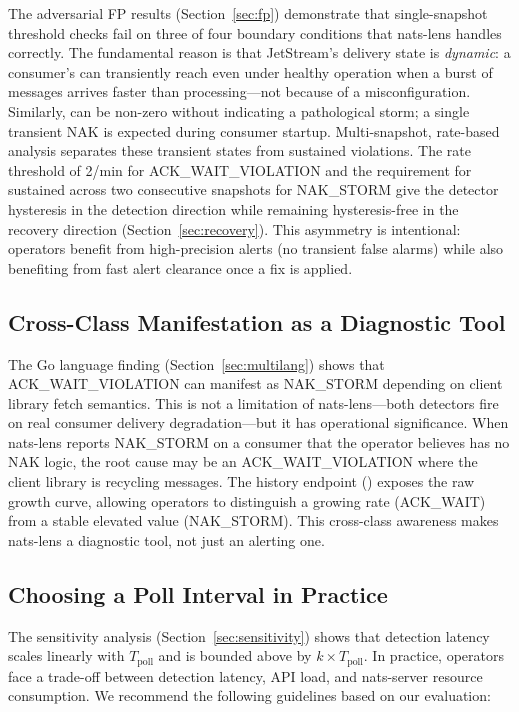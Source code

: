 \documentclass[journal]{IEEEtran}
\begin{document}
The adversarial FP results (Section~\ref{sec:fp}) demonstrate that
single-snapshot threshold checks fail on three of four boundary
conditions that nats-lens handles correctly.
The fundamental reason is that JetStream's delivery state is
\emph{dynamic}: a consumer's  can transiently
reach  even under healthy operation when a burst
of messages arrives faster than processing---not because of a
misconfiguration. Similarly,  can be non-zero
without indicating a pathological storm; a single transient NAK is
expected during consumer startup.
Multi-snapshot, rate-based analysis separates these transient states
from sustained violations. The rate threshold of 2/min for
ACK\_WAIT\_VIOLATION and the requirement for sustained
 across two consecutive snapshots for NAK\_STORM
give the detector hysteresis in the detection direction while remaining
hysteresis-free in the recovery direction (Section~\ref{sec:recovery}).
This asymmetry is intentional: operators benefit from high-precision
alerts (no transient false alarms) while also benefiting from fast alert
clearance once a fix is applied.

\subsection{Cross-Class Manifestation as a Diagnostic Tool}

The Go language finding (Section~\ref{sec:multilang}) shows that
ACK\_WAIT\_VIOLATION can manifest as NAK\_STORM depending on client
library fetch semantics.
This is not a limitation of nats-lens---both detectors fire on real
consumer delivery degradation---but it has operational significance.
When nats-lens reports NAK\_STORM on a consumer that the operator
believes has no NAK logic, the root cause may be an
ACK\_WAIT\_VIOLATION where the client library is recycling messages.
The history endpoint ()
exposes the raw  growth curve, allowing operators
to distinguish a growing rate (ACK\_WAIT) from a stable elevated value
(NAK\_STORM). This cross-class awareness makes nats-lens a diagnostic
tool, not just an alerting one.

\subsection{Choosing a Poll Interval in Practice}

The sensitivity analysis (Section~\ref{sec:sensitivity}) shows that
detection latency scales linearly with $T_\text{poll}$ and is bounded
above by $k \times T_\text{poll}$.
In practice, operators face a trade-off between detection latency,
API load, and nats-server resource consumption.
We recommend the following guidelines based on our evaluation:
\end{document}
